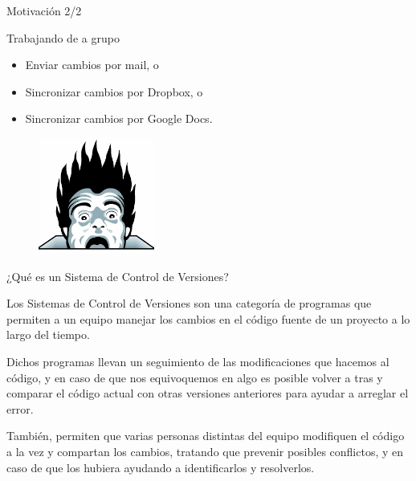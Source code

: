\documentclass{beamer}
\begin{document}
\begin{frame}{Motivación 2/2}

    \begin{block}{Trabajando de a grupo}
        \begin{itemize}
            \item Enviar cambios por mail, o
            \pause
            \item Sincronizar cambios por Dropbox, o
            \pause
            \item Sincronizar cambios por Google Docs.
        \end{itemize}
    \end{block}

    \pause
    \begin{figure}[ht]
        \begin{center}
            \includegraphics[height=1.5in]{images/horror.png}
        \end{center}
    \end{figure}

\end{frame}

\begin{frame}{¿Qué es un Sistema de Control de Versiones?}

	\begin{block}{}
		Los Sistemas de Control de Versiones son una categoría de programas que permiten a un equipo manejar los cambios en el código fuente de un proyecto a lo largo del tiempo.

		Dichos programas llevan un seguimiento de las modificaciones que hacemos al código, y en caso de que nos equivoquemos en algo es posible volver a tras y comparar el código actual con otras versiones anteriores para ayudar a arreglar el error.

		También, permiten que varias personas distintas del equipo modifiquen el código a la vez y compartan los cambios, tratando que prevenir posibles conflictos, y en caso de que los hubiera ayudando a identificarlos y resolverlos. 

	\end{block}

\end{frame}
\end{document}
